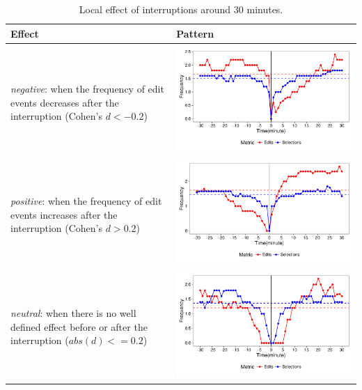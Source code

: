 \begin{table}[ht!]
	\caption{Local effect of interruptions around 30 minutes. }
	\label{tbl:local_effect}
	\centering
	\begin{tabular}{m{6cm} | m{6cm}}
		\hline
		Effect & Pattern \\
		\hline
		\hline \\
		\textit{negative}: when the frequency of edit events decreases after the interruption (Cohen's $d < -0.2$)
		& 
		  \multicolumn{1}{m{3cm}}{\includegraphics[scale=0.4]{Figures/UDC_local_effect_negative}} 
		      \\
		\textit{positive}: when the frequency of edit events increases after the interruption (Cohen's $d > 0.2$)
		& \multicolumn{1}{m{3cm}}{\includegraphics[scale=0.4]{Figures/UDC_local_effect_positive}} 
		\\
		\textit{neutral}: when there is no well defined effect before or after the interruption ($abs(d) <= 0.2$)
		& \multicolumn{1}{m{3cm}}{\includegraphics[scale=0.4]{Figures/UDC_local_effect_neutral}} 

\end{tabular}
\end{table}
